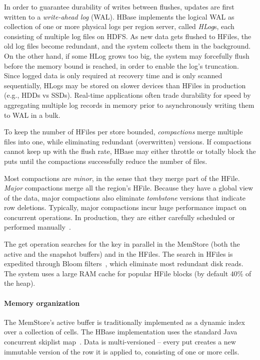 In order to guarantee durability of writes between flushes, updates are first written to 
a \emph{write-ahead log} (WAL). HBase implements the logical WAL as collection of one or more physical 
logs per region server, called \emph{HLog}s, each consisting of multiple log files on HDFS. 
As new data gets flushed to HFiles, the old log files become redundant, and the system collects 
them in the background. On the other hand, if some HLog grows too big, the system may forcefully
flush before the memory bound is reached, in order to enable the log's truncation. 
Since logged data is only required at recovery time and is only scanned sequentially, HLogs
may be stored on slower devices than HFiles in production (e.g., HDDs vs SSDs). 
Real-time applications often trade durability for speed by aggregating multiple log records 
in memory prior to asynchronously writing them to WAL in a bulk. 

To keep the number of HFiles per store bounded, \emph{compactions} merge multiple files 
into one, while eliminating redundant (overwritten) versions. If compactions cannot keep up
with the flush rate, HBase may either throttle or totally block the puts until the compactions 
successfully reduce the number of files. 

Most compactions are \emph{minor}, 
in the sense that they merge part of the HFile. \emph{Major} compactions merge all the region's 
HFile. Because they have a global view of the data, major compactions also eliminate 
{\em tombstone} versions that indicate row deletions. Typically, major compactions incur huge 
performance impact on concurrent operations. In production, they are either carefully scheduled 
or performed manually~\cite{hbasetuning}.

The get operation searches for the key in parallel in the MemStore (both the active and the 
snapshot buffers) and in the HFiles. The search in HFiles is expedited through Bloom 
filters~\cite{Chang2008}, which eliminate most redundant disk reads. The system 
uses a large RAM cache for popular HFile blocks (by default $40\%$ of the heap).

\paragraph{Memory organization}
The MemStore's active buffer is traditionally implemented as a dynamic index over a collection of cells.  
The HBase implementation uses the standard Java concurrent skiplist map~\cite{javaskiplist}.
Data is multi-versioned -- every put creates a new immutable version of the row it is applied to, 
consisting of one or more cells. 

